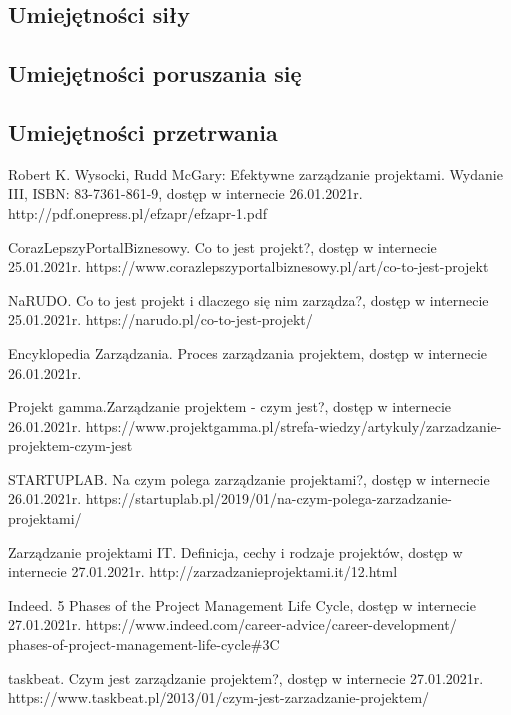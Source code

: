 \documentclass[oneside,polski,logo]{amuthesis}
\begin{document}
\subsection{Umiejętności siły}
\subsection{Umiejętności poruszania się}
\subsection{Umiejętności przetrwania}

\begin{thebibliography}{7}

Robert K. Wysocki, Rudd McGary: Efektywne zarządzanie projektami. Wydanie III, ISBN: 83-7361-861-9, dostęp w internecie 26.01.2021r.
http://pdf.onepress.pl/efzapr/efzapr-1.pdf

CorazLepszyPortalBiznesowy. Co to jest projekt?, dostęp w internecie 25.01.2021r.
https://www.corazlepszyportalbiznesowy.pl/art/co-to-jest-projekt

NaRUDO. Co to jest projekt i dlaczego się nim zarządza?, dostęp w internecie 25.01.2021r.
https://narudo.pl/co-to-jest-projekt/

Encyklopedia Zarządzania. Proces zarządzania projektem, dostęp w internecie 26.01.2021r.

Projekt gamma.Zarządzanie projektem - czym jest?, dostęp w internecie 26.01.2021r.
https://www.projektgamma.pl/strefa-wiedzy/artykuly/zarzadzanie-projektem-czym-jest

STARTUPLAB. Na czym polega zarządzanie projektami?, dostęp w internecie 26.01.2021r.
https://startuplab.pl/2019/01/na-czym-polega-zarzadzanie-projektami/

Zarządzanie projektami IT. Definicja, cechy i rodzaje projektów, dostęp w internecie 27.01.2021r.
http://zarzadzanieprojektami.it/12.html

Indeed. 5 Phases of the Project Management Life Cycle, dostęp w internecie 27.01.2021r.
https://www.indeed.com/career-advice/career-development/\\phases-of-project-management-life-cycle\#3C

taskbeat. Czym jest zarządzanie projektem?, dostęp w internecie 27.01.2021r.
https://www.taskbeat.pl/2013/01/czym-jest-zarzadzanie-projektem/


\end{thebibliography}
\end{document}
